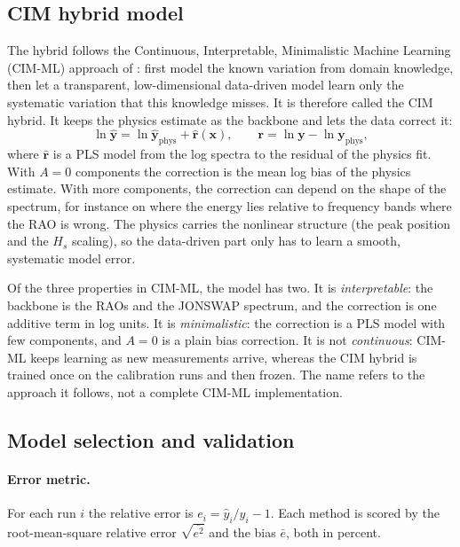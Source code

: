\documentclass[11pt,a4paper]{article}
\newcommand{\Hs}{H_{s}}
\newcommand{\vect}[1]{\boldsymbol{#1}}
\begin{document}
\subsection{CIM hybrid model}
\label{sec:hybrid}

The hybrid follows the Continuous, Interpretable, Minimalistic Machine Learning (CIM-ML)
approach of \citet{martens2025}: first model the known variation from domain knowledge, then let
a transparent, low-dimensional data-driven model learn only the systematic variation that this
knowledge misses. It is therefore called the CIM hybrid. It keeps the physics estimate as the
backbone and lets the data correct it:
\begin{equation}
  \ln \hat{\vect y} = \ln \hat{\vect y}_{\text{phys}} + \hat{\vect r}(\vect x),
  \qquad
  \vect r = \ln\vect y - \ln\vect y_{\text{phys}},
  \label{eq:hybrid}
\end{equation}
where $\hat{\vect r}$ is a PLS model from the log spectra to the residual of the physics fit.
With $A = 0$ components the correction is the mean log bias of the physics estimate. With more
components, the correction can depend on the shape of the spectrum, for instance on where the
energy lies relative to frequency bands where the RAO is wrong. The physics carries the
nonlinear structure (the peak position and the $\Hs$ scaling), so the data-driven part only has
to learn a smooth, systematic model error.

Of the three properties in CIM-ML, the model has two. It is \emph{interpretable}: the backbone
is the RAOs and the JONSWAP spectrum, and the correction is one additive term in log units. It
is \emph{minimalistic}: the correction is a PLS model with few components, and $A = 0$ is a plain
bias correction. It is not \emph{continuous}: CIM-ML keeps learning as new measurements arrive,
whereas the CIM hybrid is trained once on the calibration runs and then frozen. The name refers
to the approach it follows, not a complete CIM-ML implementation.

\subsection{Model selection and validation}
\label{sec:validation}

\paragraph{Error metric.}
For each run $i$ the relative error is $e_i = \hat y_i / y_i - 1$. Each method is scored by
the root-mean-square relative error $\sqrt{\overline{e^2}}$ and the bias $\bar e$, both in
percent.
\end{document}

